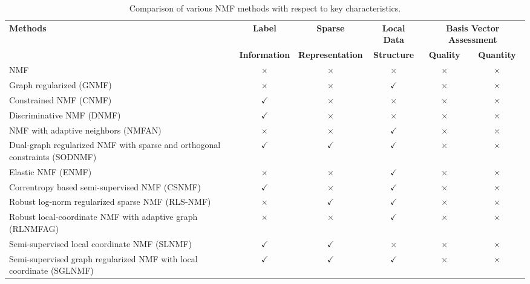 \documentclass[a4paper,fleqn]{cas-sc}
\begin{document}
\begin{table}[ht]
	\centering
	\caption{Comparison of various NMF methods with respect to key characteristics.}
	{\footnotesize
	\begin{tabular}{p{6cm} c c c c c}
		\toprule
		\multirow{2}{*}{\textbf{Methods}} & \textbf{Label} & \textbf{Sparse} & \textbf{Local Data} & \multicolumn{2}{c}{\textbf{Basis Vector Assessment}} \\
		\cline{5-6}
		& \textbf{Information}  & \textbf{Representation}  & \textbf{Structure}  & \textbf{Quality} & \textbf{Quantity} \\
		\midrule
		NMF \cite{7} & \(\times\) & \(\times\) & \(\times\) & \(\times\) & \(\times\) \\
		\hline
		Graph regularized (GNMF) \cite{19} & \(\times\) & \(\times\) & \(\checkmark\) & \(\times\) & \(\times\) \\
		\hline
		Constrained NMF (CNMF) \cite{9} & \(\checkmark\) & \(\times\) & \(\times\) & \(\times\) & \(\times\) \\
		\hline
		Discriminative NMF (DNMF) \cite{11} & \(\checkmark\) & \(\times\) & \(\times\) & \(\times\) & \(\times\) \\
		\hline
		NMF with adaptive neighbors (NMFAN) \cite{38} & \(\times\) & \(\times\) & \(\checkmark\) & \(\times\) & \(\times\) \\
		\hline
		Dual-graph regularized NMF with sparse and orthogonal constraints (SODNMF) \cite{23} & \(\checkmark\) & \(\checkmark\) & \(\checkmark\) & \(\times\) & \(\times\) \\
		\hline
		Elastic NMF (ENMF) \cite{17} & \(\times\) & \(\times\) & \(\checkmark\) & \(\times\) & \(\times\) \\
		\hline
		Correntropy based semi-supervised NMF (CSNMF) \cite{10} & \(\checkmark\) & \(\times\) & \(\checkmark\) & \(\times\) & \(\times\) \\
		\hline
		Robust log-norm regularized sparse NMF (RLS-NMF) \cite{38} & \(\times\) & \(\checkmark\) & \(\checkmark\) & \(\times\) & \(\times\) \\
		\hline
		Robust local-coordinate NMF with adaptive graph (RLNMFAG) \cite{16} & \(\times\) & \(\times\) & \(\checkmark\) & \(\times\) & \(\times\) \\
		\hline
		Semi-supervised local coordinate NMF (SLNMF) \cite{24} & \(\checkmark\) & \(\checkmark\) & \(\times\) & \(\times\) & \(\times\) \\
		\hline
		Semi-supervised graph regularized NMF with local coordinate (SGLNMF) \cite{24} & \(\checkmark\) & \(\checkmark\) & \(\checkmark\) & \(\times\) & \(\times\) \\

\end{tabular}}
\end{table}
\end{document}
